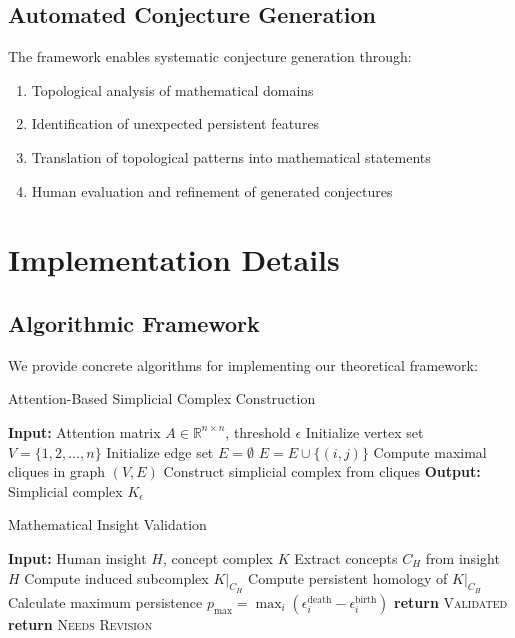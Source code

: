 \documentclass[11pt]{article}
\newcommand{\R}{\mathbb{R}}
\begin{document}
\subsection{Automated Conjecture Generation}

The framework enables systematic conjecture generation through:

\begin{enumerate}
\item Topological analysis of mathematical domains
\item Identification of unexpected persistent features
\item Translation of topological patterns into mathematical statements
\item Human evaluation and refinement of generated conjectures
\end{enumerate}

\section{Implementation Details}

\subsection{Algorithmic Framework}

We provide concrete algorithms for implementing our theoretical framework:

\begin{algorithm}
\caption{Attention-Based Simplicial Complex Construction}
\begin{algorithmic}[1]
\STATE \textbf{Input:} Attention matrix $A \in \R^{n \times n}$, threshold $\epsilon$
\STATE Initialize vertex set $V = \{1, 2, \ldots, n\}$
\STATE Initialize edge set $E = \emptyset$
            \STATE $E = E \cup \{(i,j)\}$
        \ENDIF
    \ENDFOR
\ENDFOR
\STATE Compute maximal cliques in graph $(V, E)$
\STATE Construct simplicial complex from cliques
\STATE \textbf{Output:} Simplicial complex $K_\epsilon$
\end{algorithmic}
\end{algorithm}

\begin{algorithm}
\caption{Mathematical Insight Validation}
\begin{algorithmic}[1]
\STATE \textbf{Input:} Human insight $H$, concept complex $K$
\STATE Extract concepts $C_H$ from insight $H$
\STATE Compute induced subcomplex $K|_{C_H}$
\STATE Compute persistent homology of $K|_{C_H}$
\STATE Calculate maximum persistence $p_{\max} = \max_i (\epsilon_i^{\text{death}} - \epsilon_i^{\text{birth}})$
    \STATE \textbf{return} \textsc{Validated}
\ELSE
    \STATE \textbf{return} \textsc{Needs Revision}
\ENDIF
\end{algorithmic}
\end{algorithm}
\end{document}
